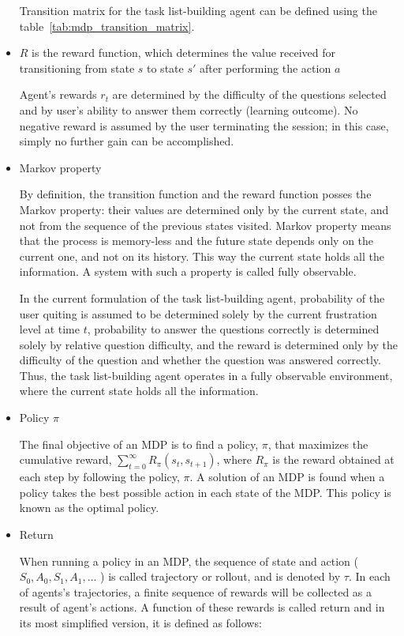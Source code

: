 \begin{itemize}
    Transition matrix for the task list-building agent can be defined using the table~\ref{tab:mdp_transition_matrix}.

    \item $R$ is the reward function, which determines the value received for transitioning from state $s$ to state $s'$ after performing the action $a$

    Agent's rewards $r_t$ are determined by the difficulty of the questions selected and by user's ability to answer them correctly (learning outcome).
    No negative reward is assumed by the user terminating the session;
    in this case, simply no further gain can be accomplished.

    \item Markov property

    By definition, the transition function and the reward function posses the Markov property: their values are determined only by the current state, and not from the sequence of the previous states visited.
    Markov property means that the process is memory-less and the future state depends only on the current one, and not on its history.
    This way the current state holds all the information.
    A system with such a property is called fully observable.

    In the current formulation of the task list-building agent, probability of the user quiting is assumed to be determined solely by the current frustration level at time $t$, probability to answer the questions correctly is determined solely by relative question difficulty, and the reward is determined only by the difficulty of the question and whether the question was answered correctly.
    Thus, the task list-building agent operates in a fully observable environment, where the current state holds all the information.

    \item Policy $\pi$

    The final objective of an MDP is to find a policy, $\pi$, that maximizes the cumulative reward, $ \sum \limits_{t=0}^\infty R_\pi (s_t, s_{t+1} ) $,
    where $R_\pi$ is the reward obtained at each step by following the policy, $\pi$.
    A solution of an MDP is found when a policy takes the best possible action in each state of the MDP.
    This policy is known as the optimal policy.

    \item Return

    When running a policy in an MDP, the sequence of state and action ( $ S_0, A_0, S_1, A_1, \dots $ ) is called trajectory or rollout, and is denoted by $\tau$.
    In each of agents's trajectories, a finite sequence of rewards will be collected as a result of agent's actions.
    A function of these rewards is called return and in its most simplified version, it is defined as follows:



\end{itemize}
